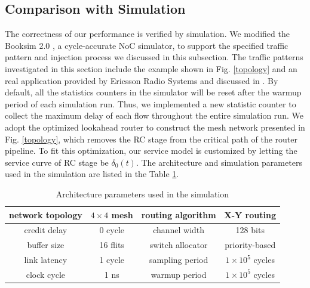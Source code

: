 \documentclass[preprint]{elsarticle}
\begin{document}
\subsection{Comparison with Simulation}\label{sim}
The correctness of our performance is verified by simulation. We modified the Booksim 2.0 \cite{6557149}, a cycle-accurate NoC simulator, to support the specified traffic pattern and injection process we discussed in this subsection. The traffic patterns investigated in this section include the example shown in Fig. \ref{topology} and an real application provided by Ericsson Radio Systems and discussed in \cite{LuJa08}\cite{Jafari1922089}. By default, all the statistics counters in the simulator will be reset after the warmup period of each simulation run. Thus, we implemented a new statistic counter to collect the maximum delay of each flow throughout the entire simulation run. We adopt the optimized lookahead router \cite{jerger2009chip} to construct the mesh network presented in Fig. \ref{topology}, which removes the RC stage from the critical path of the router pipeline. To fit this optimization, our service model is customized by letting the service curve of RC stage be $\delta_0(t)$. The architecture and simulation parameters used in the simulation are listed in the Table \ref{arcpara}.
\begin{table}[htbp]
\centering
\caption{\label{arcpara}Architecture parameters used in the simulation}
\begin{tabular}{|c|c||c|c|}
\hline
network topology    & $4\times 4$ mesh  &   routing algorithm & X-Y routing\\
\hline
credit delay &  0 cycle &   channel width   & 128 bits\\
\hline
buffer size &   16 flits  &   switch allocator    &   priority-based\\
\hline
link latency    &   1 cycle    & sampling period &   $1\times 10^5$ cycles\\
\hline
clock cycle &   1 ns    &   warmup period   &   $1\times 10^5$ cycles\\
\hline
\end{tabular}
\end{table}
\end{document}
